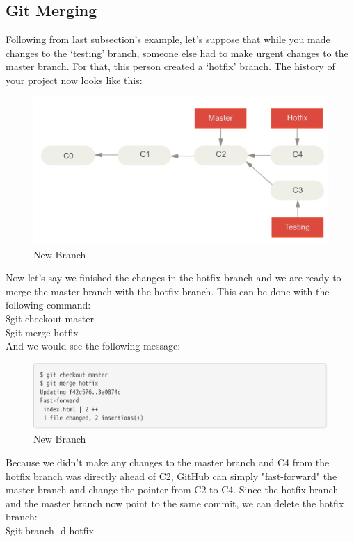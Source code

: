 \documentclass{article}
\begin{document}
    \subsection{Git Merging}
    Following from last subsection's example, let's suppose that while you made changes to the `testing' branch, someone else had to make urgent changes to the master branch. For that, this person created a `hotfix' branch. The history of your project now looks like this: 
    \begin{figure}[H]
	\caption{New Branch}
	\includegraphics[scale=0.5]{images/figure7.png}
	\centering
    \end{figure} 
    Now let's say we finished the changes in the hotfix branch and we are ready to merge the master branch with the hotfix branch. This can be done with the following command:\\
    \newline
    \indent \$git checkout master \\ 
    \newline
    \indent \$git merge hotfix \\
    \newline
    And we would see the following message:
    \begin{figure}[H]
    	\caption{New Branch}
    	\includegraphics[scale=0.5]{images/figure8.png}
    	\centering
    \end{figure} 
    \vspace{0.2 in}
    Because we didn't make any changes to the master branch and C4 from the hotfix branch was directly ahead of C2, GitHub can simply "fast-forward" the master branch and change the pointer from C2 to C4. Since the hotfix branch and the master branch now point to the same commit, we can delete the hotfix branch: \\
    \newline
    \indent \$git branch -d hotfix 
\end{document}
